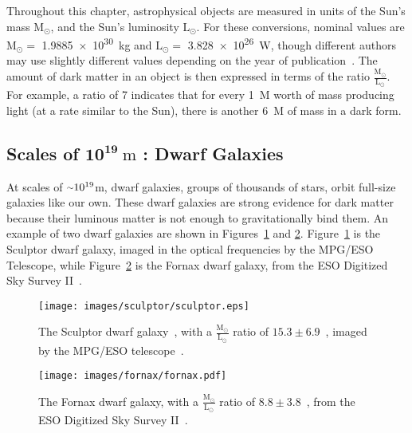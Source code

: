 Throughout this chapter, astrophysical objects are measured in units of the Sun's mass $\textrm{M}_\odot$, and the Sun's luminosity $\textrm{L}_\odot$.
For these conversions, nominal values are $\textrm{M}_\odot =$ \SI{1.9885e30}{kg} and $\textrm{L}_\odot =$ \SI{3.828e26}{W}, though different authors may use slightly different values depending on the year of publication~\cite{iau_solarconstants}.
The amount of dark matter in an object is then expressed in terms of the ratio $\frac{\textrm{M}_\odot}{\textrm{L}_\odot}$.
For example, a ratio of \SI{7}{} indicates that for every \SI{1}{M_\odot} worth of mass producing light (at a rate similar to the Sun), there is another \SI{6}{M_\odot} of mass in a dark form.
  
\subsection[Scales of $10^{19}\:\text{m}$ : Dwarf Galaxies]{Scales of $\mathbf{10^{19}}\:\text{m}$ : Dwarf Galaxies}\label{dm_dwarfscale}
At scales of $\nicetilde 10^{19}$m, dwarf galaxies, groups of thousands of stars, orbit full-size galaxies like our own.
These dwarf galaxies are strong evidence for dark matter because their luminous matter is not enough to gravitationally bind them.
An example of two dwarf galaxies are shown in Figures~\ref{fig:sculptor} and \ref{fig:fornax}.
Figure~\ref{fig:sculptor} is the Sculptor dwarf galaxy, imaged in the optical frequencies by the MPG/ESO Telescope, while Figure~\ref{fig:fornax} is the Fornax dwarf galaxy, from the ESO Digitized Sky Survey II~\cite{fornax_image}.

\begin{figure}[!ht]
  \centering
  \texttt{[image: images/sculptor/sculptor.eps]}
  \caption[Sculptor Dwarf Galaxy]{
    The Sculptor dwarf galaxy~\cite{sculptor_image}, with a $\frac{\textrm{M}_\odot}{\textrm{L}_\odot}$ ratio of $15.3\pm6.9$~\cite{sculptor_ml}, imaged by the MPG/ESO telescope~\cite{sculptor_paper}.
  }
  \label{fig:sculptor}
\end{figure}

\begin{figure}[!ht]
  \centering
  \texttt{[image: images/fornax/fornax.pdf]}
  \caption[Fornax Dwarf Galaxy]{
    The Fornax dwarf galaxy, with a $\frac{\textrm{M}_\odot}{\textrm{L}_\odot}$ ratio of $8.8\pm3.8$~\cite{sculptor_ml}, from the ESO Digitized Sky Survey II~\cite{fornax_image}.
  }
  \label{fig:fornax}
\end{figure}


